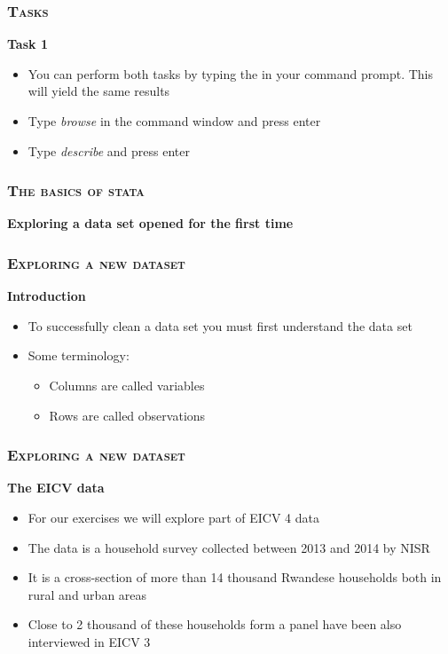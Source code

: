 \documentclass[10pt]{beamer}
\begin{document}
	\begin{frame}
		\frametitle{\textsc{Tasks}}
		\begin{center}
			\Large\textbf{Task 1}
		\end{center}
		\begin{itemize}
			\item You can perform both tasks by typing the in your command prompt. This will yield the same results
			
			\item Type \textit{browse} in the command window and press enter
			
			\item Type \textit{describe} and press enter
			
		\end{itemize}
	\end{frame}





	\begin{frame}
		\frametitle{\textsc{The basics of stata}}
		\begin{center}
			\Large\textbf{Exploring a data set opened for the first time}
		\end{center}
	\end{frame}

	\begin{frame}
		\frametitle{\textsc{Exploring a new dataset}}
		\begin{center}
			\Large\textbf{Introduction}
		\end{center}
		\begin{itemize}
			\item To successfully clean a data set you must first understand the data set
			\item Some terminology:
			\begin{itemize}
				\item Columns are called variables
				\item Rows are called observations
			\end{itemize}
		\end{itemize}
	\end{frame}
		
		
	\begin{frame}
		\frametitle{\textsc{Exploring a new dataset}}
		\begin{center}
			\Large\textbf{The EICV data}
		\end{center}
		\begin{itemize}
			\item For our exercises we will explore part of EICV 4 data
			\item The data is a household survey collected between 2013 and 2014 by NISR
			\item It is a cross-section of more than 14 thousand Rwandese households both in rural and urban areas
			\item Close to 2 thousand of these households form a panel have been also interviewed in EICV 3		
		\end{itemize}
	\end{frame}
\end{document}
